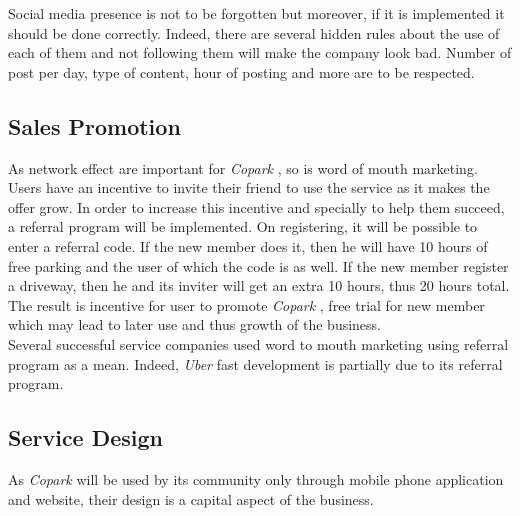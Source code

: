 \documentclass[12pt,a4paper,oneside]{book}
\newcommand{\bp}{\textit{Copark }}
\begin{document}
Social media presence is not to be forgotten but moreover, if it is implemented it should be done correctly. Indeed, there are several hidden rules about the use of each of them and not following them will make the company look bad. Number of post per day, type of content, hour of posting and more are to be respected.\cite{smrules}

\subsection{Sales Promotion}
As network effect are important for \bp, so is word of mouth marketing.\\
Users have an incentive to invite their friend to use the service as it makes the offer grow. In order to increase this incentive and specially to help them succeed, a referral program will be implemented. On registering, it will be possible to enter a referral code. If the new member does it, then he will have 10 hours of free parking and the user of which the code is as well. If the new member register a driveway, then he and its inviter will get an extra 10 hours, thus 20 hours total.\\
The result is incentive for user to promote \bp, free trial for new member which may lead to later use and thus growth of the business.\\

Several successful service companies used word to mouth marketing using referral program as a mean. Indeed, \textit{Uber} fast development is partially due to its referral program.\cite{uberef}

\subsection{Service Design}
As \bp will be used by its community only through mobile phone application and website, their design is a capital aspect of the business.\\
\end{document}
